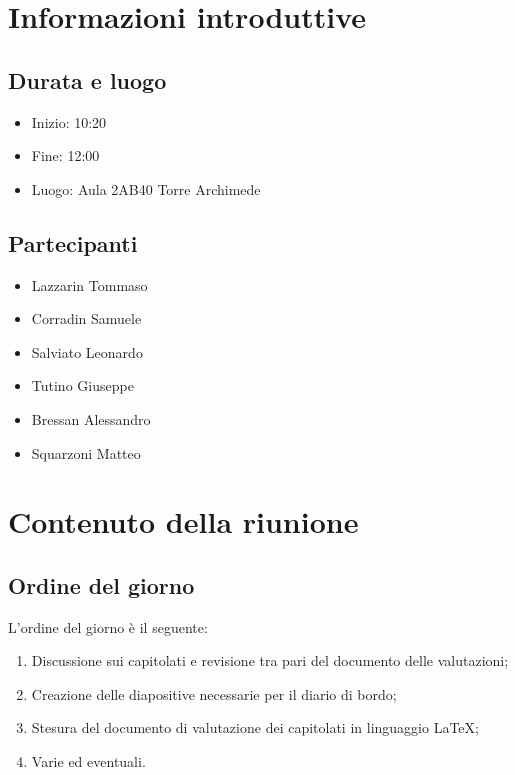 \documentclass[10pt]{article}
\begin{document}
\newpage

\tableofcontents{\newpage}
\section{Informazioni introduttive}
\subsection{Durata e luogo}
\begin{itemize}
  \item Inizio: 10:20
  \item Fine: 12:00
  \item Luogo: Aula 2AB40 Torre Archimede
\end{itemize}
\subsection{Partecipanti}
\begin{itemize}
    \item Lazzarin Tommaso
    \item Corradin Samuele
    \item Salviato Leonardo
    \item Tutino Giuseppe
    \item Bressan Alessandro
    \item Squarzoni Matteo
\end{itemize}
\section{Contenuto della riunione}
\subsection{Ordine del giorno}
L'ordine del giorno è il seguente:
\begin{enumerate}
    \item Discussione sui capitolati e revisione tra pari del documento delle valutazioni;
    \item Creazione delle diapositive necessarie per il diario di bordo;
    \item Stesura del documento di valutazione dei capitolati in linguaggio LaTeX;
    \item Varie ed eventuali.
\end{enumerate}
\end{document}
